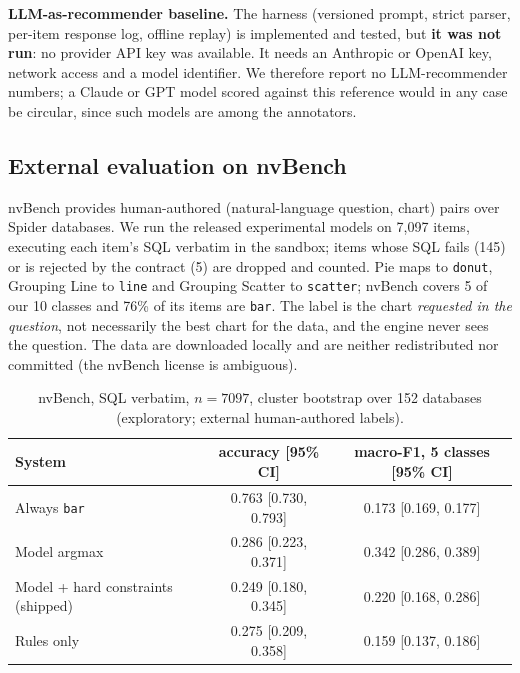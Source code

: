 \documentclass[11pt]{article}
\newcommand{\sql}[1]{\texttt{#1}}
\begin{document}
\textbf{LLM-as-recommender baseline.} The harness (versioned prompt, strict parser, per-item response log, offline replay) is implemented and tested, but \textbf{it was not run}: no provider API key was available. It needs an Anthropic or OpenAI key, network access and a model identifier. We therefore report no LLM-recommender numbers; a Claude or GPT model scored against this reference would in any case be circular, since such models are among the annotators.

\subsection{External evaluation on nvBench}\label{sec:nvbench}
nvBench provides human-authored (natural-language question, chart) pairs over Spider databases. We run the released experimental models on 7{,}097 items, executing each item's SQL verbatim in the sandbox; items whose SQL fails (145) or is rejected by the contract (5) are dropped and counted. Pie maps to \sql{donut}, Grouping Line to \sql{line} and Grouping Scatter to \sql{scatter}; nvBench covers 5 of our 10 classes and 76\% of its items are \sql{bar}. The label is the chart \emph{requested in the question}, not necessarily the best chart for the data, and the engine never sees the question. The data are downloaded locally and are neither redistributed nor committed (the nvBench license is ambiguous).
\begin{table}[h]\centering\small
\begin{tabular}{lcc}\toprule
System & accuracy [95\% CI] & macro-F1, 5 classes [95\% CI]\\\midrule
Always \sql{bar} & 0.763 [0.730, 0.793] & 0.173 [0.169, 0.177]\\
Model argmax & 0.286 [0.223, 0.371] & 0.342 [0.286, 0.389]\\
Model + hard constraints (shipped) & 0.249 [0.180, 0.345] & 0.220 [0.168, 0.286]\\
Rules only & 0.275 [0.209, 0.358] & 0.159 [0.137, 0.186]\\\bottomrule
\end{tabular}
\caption{nvBench, SQL verbatim, $n=7097$, cluster bootstrap over 152 databases (exploratory; external human-authored labels).}\label{tab:nvbench}
\end{table}
\end{document}

